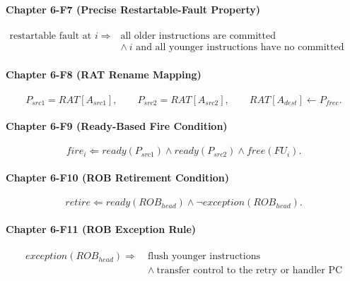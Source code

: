 \paragraph{Chapter 6-F7 (Precise Restartable-Fault Property)}\label{par:ch6-formula-7}
\begin{equation}\label{eq:app-ch6-formula-precise}
    \begin{aligned}
        \text{restartable fault at }i \Rightarrow\ &\text{all older instructions are committed}\\
        &\wedge\ \text{$i$ and all younger instructions have no committed effects}
    \end{aligned}
\end{equation}

\paragraph{Chapter 6-F8 (RAT Rename Mapping)}\label{par:ch6-formula-8}
\begin{equation}\label{eq:app-ch6-formula-rat}
    P_{src1}=RAT[A_{src1}],\qquad
    P_{src2}=RAT[A_{src2}],\qquad
    RAT[A_{dest}]\leftarrow P_{free}.
\end{equation}

\paragraph{Chapter 6-F9 (Ready-Based Fire Condition)}\label{par:ch6-formula-9}
\begin{equation}\label{eq:app-ch6-formula-fire-ready}
    fire_i \Leftarrow ready(P_{src1})\wedge ready(P_{src2})\wedge free(FU_i).
\end{equation}

\paragraph{Chapter 6-F10 (ROB Retirement Condition)}\label{par:ch6-formula-10}
\begin{equation}\label{eq:app-ch6-formula-retire}
    retire \Leftarrow ready(ROB_{head})\wedge \neg exception(ROB_{head}).
\end{equation}

\paragraph{Chapter 6-F11 (ROB Exception Rule)}\label{par:ch6-formula-11}
\begin{equation}\label{eq:app-ch6-formula-exception}
    \begin{aligned}
        exception(ROB_{head}) \Rightarrow\ &\text{flush younger instructions}\\
        &\wedge\ \text{transfer control to the retry or handler PC}
    \end{aligned}
\end{equation}


